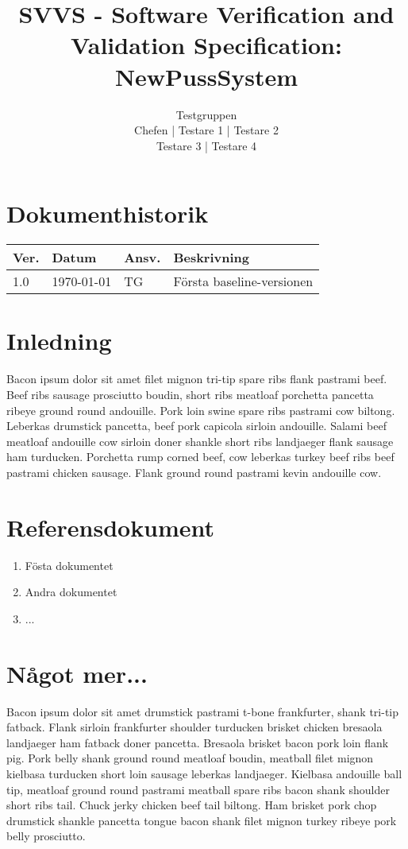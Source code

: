 \documentclass[a4paper]{article}
\title{SVVS - Software Verification and Validation Specification: NewPussSystem}
\author{Testgruppen \\ Chefen | Testare 1 | Testare 2 \\ Testare 3 | Testare 4}
\date{}
\begin{document}
\maketitle
\thispagestyle{fancy}
\tableofcontents
\newpage

\section*{Dokumenthistorik}

\begin{tabular}{ l l l l }
Ver. & Datum & Ansv. & Beskrivning \\\hline
1.0 & \today & TG & Första baseline-versionen

\end{tabular}
\section{Inledning}       

Bacon ipsum dolor sit amet filet mignon tri-tip spare ribs flank pastrami beef. Beef ribs sausage prosciutto boudin, short ribs meatloaf porchetta pancetta ribeye ground round andouille. Pork loin swine spare ribs pastrami cow biltong. Leberkas drumstick pancetta, beef pork capicola sirloin andouille. Salami beef meatloaf andouille cow sirloin doner shankle short ribs landjaeger flank sausage ham turducken. Porchetta rump corned beef, cow leberkas turkey beef ribs beef pastrami chicken sausage. Flank ground round pastrami kevin andouille cow.

\section{Referensdokument}
\begin{enumerate}
\item Fösta dokumentet
\item Andra dokumentet
\item ...

\end{enumerate}

\section{Något mer...}
Bacon ipsum dolor sit amet drumstick pastrami t-bone frankfurter, shank tri-tip fatback. Flank sirloin frankfurter shoulder turducken brisket chicken bresaola landjaeger ham fatback doner pancetta. Bresaola brisket bacon pork loin flank pig. Pork belly shank ground round meatloaf boudin, meatball filet mignon kielbasa turducken short loin sausage leberkas landjaeger. Kielbasa andouille ball tip, meatloaf ground round pastrami meatball spare ribs bacon shank shoulder short ribs tail. Chuck jerky chicken beef tail biltong. Ham brisket pork chop drumstick shankle pancetta tongue bacon shank filet mignon turkey ribeye pork belly prosciutto.
\end{document}
